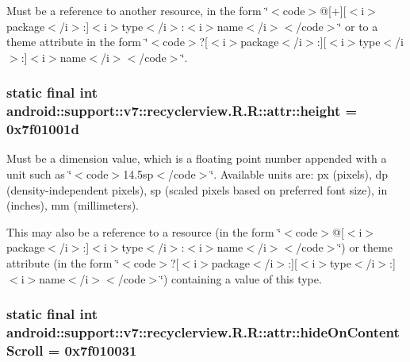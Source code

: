 Must be a reference to another resource, in the form \char`\"{}$<$code$>$@\mbox{[}+\mbox{]}\mbox{[}$<$i$>$package$<$/i$>$:\mbox{]}$<$i$>$type$<$/i$>$:$<$i$>$name$<$/i$>$$<$/code$>$\char`\"{} or to a theme attribute in the form \char`\"{}$<$code$>$?\mbox{[}$<$i$>$package$<$/i$>$:\mbox{]}\mbox{[}$<$i$>$type$<$/i$>$:\mbox{]}$<$i$>$name$<$/i$>$$<$/code$>$\char`\"{}. \hypertarget{classandroid_1_1support_1_1v7_1_1recyclerview_1_1_r_1_1attr_c5149cbf710128c8a3edb8daf63a57cd}{
\subsubsection[{height}]{\setlength{\rightskip}{0pt plus 5cm}static final int android::support::v7::recyclerview.R.R::attr::height = 0x7f01001d}}
\label{classandroid_1_1support_1_1v7_1_1recyclerview_1_1_r_1_1attr_c5149cbf710128c8a3edb8daf63a57cd}


Must be a dimension value, which is a floating point number appended with a unit such as \char`\"{}$<$code$>$14.5sp$<$/code$>$\char`\"{}. Available units are: px (pixels), dp (density-independent pixels), sp (scaled pixels based on preferred font size), in (inches), mm (millimeters). 

This may also be a reference to a resource (in the form \char`\"{}$<$code$>$@\mbox{[}$<$i$>$package$<$/i$>$:\mbox{]}$<$i$>$type$<$/i$>$:$<$i$>$name$<$/i$>$$<$/code$>$\char`\"{}) or theme attribute (in the form \char`\"{}$<$code$>$?\mbox{[}$<$i$>$package$<$/i$>$:\mbox{]}\mbox{[}$<$i$>$type$<$/i$>$:\mbox{]}$<$i$>$name$<$/i$>$$<$/code$>$\char`\"{}) containing a value of this type. \hypertarget{classandroid_1_1support_1_1v7_1_1recyclerview_1_1_r_1_1attr_eee8275b0b928b90e7fde15fa413959c}{
\subsubsection[{hideOnContentScroll}]{\setlength{\rightskip}{0pt plus 5cm}static final int android::support::v7::recyclerview.R.R::attr::hideOnContentScroll = 0x7f010031}}
\label{classandroid_1_1support_1_1v7_1_1recyclerview_1_1_r_1_1attr_eee8275b0b928b90e7fde15fa413959c}


